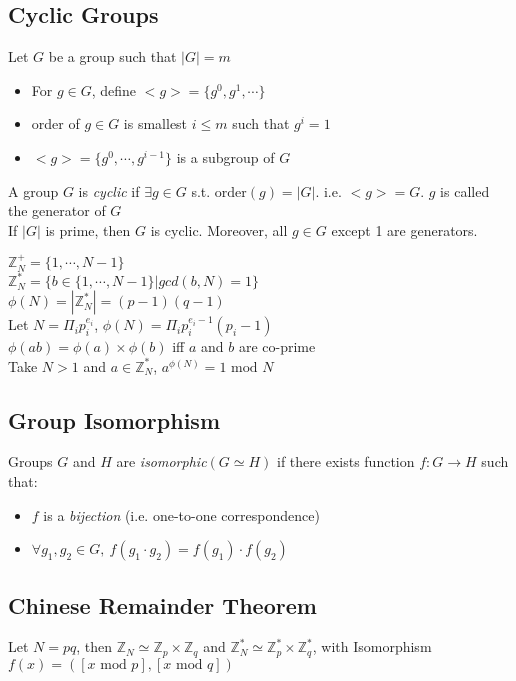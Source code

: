 \subsection*{Cyclic Groups}
Let $G$ be a group such that $|G|=m$
\begin{itemize}
    \item For $g\in G$, define $<g>=\{g^0,g^1,\cdots\}$
    \item order of $g\in G$ is smallest $i\le m$ such that $g^i=1$
    \item $<g>=\{g^0,\cdots,g^{i-1}\}$ is a subgroup of $G$
\end{itemize}
A group $G$ is \emph{cyclic} if $\exists g\in G$ s.t. $\text{order}(g)=|G|$.
i.e. $<g>=G$. $g$ is called the generator of $G$\\

If $|G|$ is prime, then $G$ is cyclic. Moreover, all $g\in G$ except 1 are generators.

$\mathbb{Z}^+_N=\{1,\cdots,N-1\}$\\
$\mathbb{Z}^*_N=\{b\in \{1,\cdots,N-1\}|gcd(b,N)=1\}$\\
$\phi(N)=|\mathbb{Z}^*_N|=(p-1)(q-1)$\\
Let $N=\Pi_{i}p_{i}^{e_i}$, $\phi(N)=\Pi_{i}p_{i}^{e_i-1}(p_i-1)$\\
$\phi(ab)=\phi(a) \times \phi(b)$ iff $a$ and $b$ are co-prime\\
Take $N>1$ and $a\in \mathbb{Z}^*_N$, $a^{\phi(N)}=1\text{ mod }N$

\subsection*{Group Isomorphism}
Groups $G$ and $H$ are \emph{isomorphic}$(G\simeq H)$ if there exists function
$f: G\rightarrow H$ such that:
\begin{itemize}
    \item $f$ is a \emph{bijection} (i.e. one-to-one correspondence)
    \item $\forall g_1,g_2 \in G,\ f(g_1\cdot g_2)=f(g_1)\cdot f(g_2)$
\end{itemize}

\subsection*{Chinese Remainder Theorem}
Let $N=pq$, then $\mathbb{Z}_N \simeq \mathbb{Z}_p \times \mathbb{Z}_q$ and
$\mathbb{Z}_N^* \simeq \mathbb{Z}_p^* \times \mathbb{Z}_q^*$, with Isomorphism
$f(x)=([x\text{ mod }p],[x\text{ mod }q])$